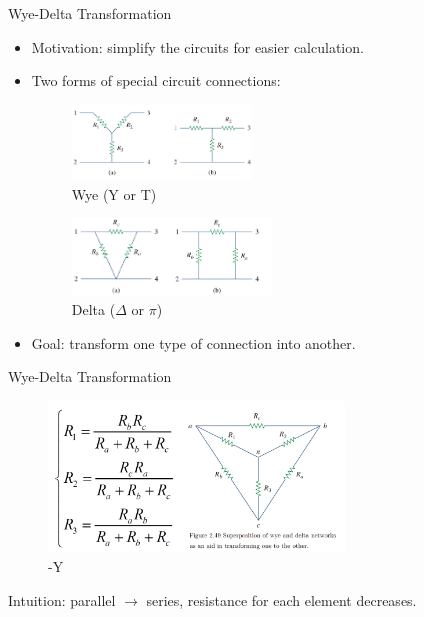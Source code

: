 \documentclass{beamer}
\begin{document}
\begin{frame}{Wye-Delta Transformation}

\begin{itemize}
    \item Motivation: simplify the circuits for easier calculation.

    \item Two forms of special circuit connections:
    \begin{multicols}
        \sectiont{}
            \begin{figure}[H]
            \centering
            \includegraphics[width=0.45\textwidth]{Y.png}
            \caption{Wye (Y or T)}
            \end{figure}
        \sectiont{}
            \begin{figure}[H]
            \centering
            \includegraphics[width=0.5\textwidth]{DELTA.png}
            \caption{Delta ($\Delta$ or $\pi$)}
            \end{figure}
        
    \end{multicols}
    \item Goal: transform one type of connection into another.
\end{itemize}

\end{frame}

\begin{frame}{Wye-Delta Transformation}
\begin{figure}[H]
\centering
\includegraphics[width=0.7\textwidth]{34.png}
\caption{\Delta-Y}
\end{figure}

Intuition: parallel $\rightarrow$ series, resistance for each element decreases.

\end{frame}
\end{document}
